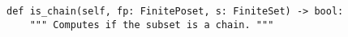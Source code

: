 \begin{verbatim}
def is_chain(self, fp: FinitePoset, s: FiniteSet) -> bool:
    """ Computes if the subset is a chain. """
\end{verbatim}